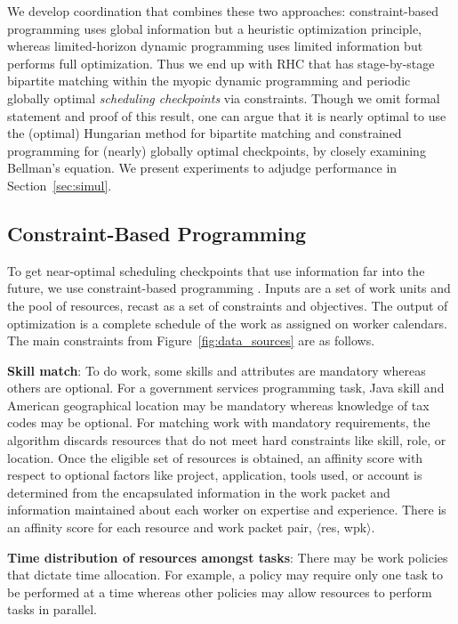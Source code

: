 \documentclass[10pt,journal,cspaper,compsoc]{IEEEtran}
\begin{document}
We develop coordination that combines these two approaches: 
constraint-based programming uses global information but a heuristic optimization principle, whereas 
limited-horizon dynamic programming uses limited information but performs full optimization.
Thus we end up with RHC that has stage-by-stage bipartite matching within the
myopic dynamic programming and periodic globally optimal \emph{scheduling checkpoints} via constraints.
Though we omit formal statement and proof of this result, one can argue  that 
it is nearly optimal to use the (optimal) Hungarian method for bipartite matching and constrained programming 
for (nearly) globally optimal checkpoints, by closely examining Bellman's equation.  We present experiments to adjudge 
performance in Section~\ref{sec:simul}. 

\subsection{Constraint-Based Programming}
To get near-optimal scheduling checkpoints that use information far into the future, we use 
constraint-based programming \cite{NavehRAGC2007,AsafERCGOM2010}. Inputs are a set of work units and the pool of resources,
recast as a set of constraints and objectives.  The output of optimization is a complete schedule of the work 
as assigned on worker calendars. The main constraints from Figure~\ref{fig:data_sources} are as follows.

{\bf Skill match}: To do work, some skills and attributes are mandatory whereas others are optional.  For a government services 
programming task, Java skill and American geographical location may be mandatory whereas knowledge of tax codes may be optional.
For matching work with mandatory requirements, the algorithm discards resources that do not meet hard constraints
like skill, role, or location.  Once the eligible set of resources is obtained, an affinity score with respect to optional factors 
like project, application, tools used, or account is determined from the encapsulated information in the work packet and 
information maintained about each worker on expertise and experience.  There is an affinity score for
each resource and work packet pair, $\langle$res, wpk$\rangle$.

{\bf Time distribution of resources amongst tasks}: There may be work policies that dictate time allocation.  For example, a policy may 
require only one task to be performed at a time whereas other policies may allow resources to perform tasks in parallel.
\end{document}
